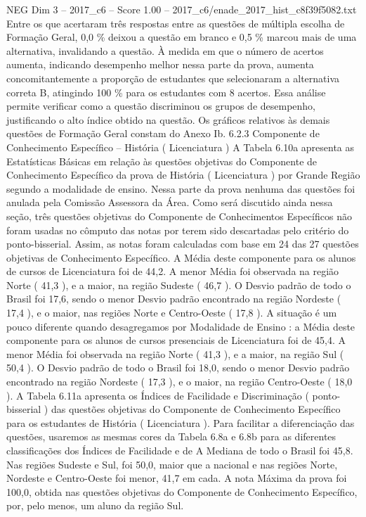 \begin{textsample}{NEG Dim 3 – 2017\_c6 – Score 1.00 – 2017\_c6/enade\_2017\_hist\_c8f39f5082.txt}
Entre os que acertaram três respostas entre as questões de múltipla escolha de Formação Geral, 0,0 \% deixou a questão em branco e 0,5 \% marcou mais de uma alternativa, invalidando a questão.
À medida em que o número de acertos aumenta, indicando desempenho melhor nessa parte da prova, aumenta concomitantemente a proporção de estudantes que selecionaram a alternativa correta B, atingindo 100 \% para os estudantes com 8 acertos.
Essa análise permite verificar como a questão discriminou os grupos de desempenho, justificando o alto índice obtido na questão.
Os gráficos relativos às demais questões de Formação Geral constam do Anexo Ib. 6.2.3 Componente de Conhecimento Específico – História ( Licenciatura ) A Tabela 6.10a apresenta as Estatísticas Básicas em relação às questões objetivas do Componente de Conhecimento Específico da prova de História ( Licenciatura ) por Grande Região segundo a modalidade de ensino.
Nessa parte da prova nenhuma das questões foi anulada pela Comissão Assessora da Área.
Como será discutido ainda nessa seção, três questões objetivas do Componente de Conhecimentos Específicos não foram usadas no cômputo das notas por terem sido descartadas pelo critério do ponto-bisserial.
Assim, as notas foram calculadas com base em 24 das 27 questões objetivas de Conhecimento Específico.
A Média deste componente para os alunos de cursos de Licenciatura foi de 44,2.
A menor Média foi observada na região Norte ( 41,3 ), e a maior, na região Sudeste ( 46,7 ).
O Desvio padrão de todo o Brasil foi 17,6, sendo o menor Desvio padrão encontrado na região Nordeste ( 17,4 ), e o maior, nas regiões Norte e Centro-Oeste ( 17,8 ).
A situação é um pouco diferente quando desagregamos por Modalidade de Ensino : a Média deste componente para os alunos de cursos presenciais de Licenciatura foi de 45,4.
A menor Média foi observada na região Norte ( 41,3 ), e a maior, na região Sul ( 50,4 ).
O Desvio padrão de todo o Brasil foi 18,0, sendo o menor Desvio padrão encontrado na região Nordeste ( 17,3 ), e o maior, na região Centro-Oeste ( 18,0 ).
A Tabela 6.11a apresenta os Índices de Facilidade e Discriminação ( ponto-bisserial ) das questões objetivas do Componente de Conhecimento Específico para os estudantes de História ( Licenciatura ).
Para facilitar a diferenciação das questões, usaremos as mesmas cores da Tabela 6.8a e 6.8b para as diferentes classificações dos Índices de Facilidade e de A Mediana de todo o Brasil foi 45,8.
Nas regiões Sudeste e Sul, foi 50,0, maior que a nacional e nas regiões Norte, Nordeste e Centro-Oeste foi menor, 41,7 em cada.
A nota Máxima da prova foi 100,0, obtida nas questões objetivas do Componente de Conhecimento Específico, por, pelo menos, um aluno da região Sul.

\end{textsample}
